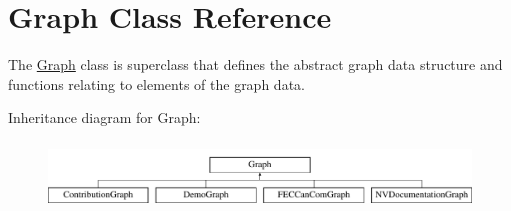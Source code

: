 \hypertarget{classGraph}{
\section{Graph Class Reference}
\label{classGraph}
}


The \hyperlink{classGraph}{Graph} class is superclass that defines the abstract graph data structure and functions relating to elements of the graph data.  


Inheritance diagram for Graph:\begin{figure}[H]
\begin{center}
\leavevmode
\includegraphics[height=1.794872cm]{classGraph}
\end{center}
\end{figure}
